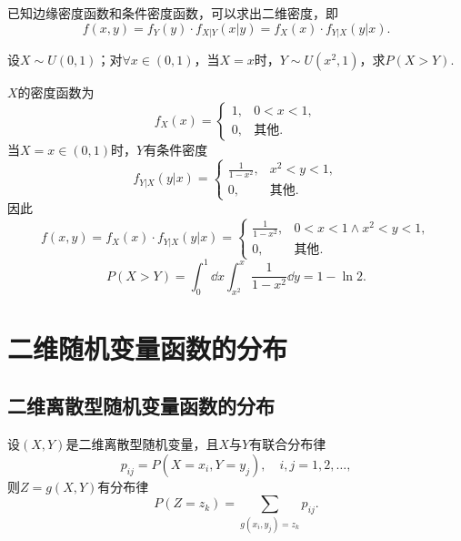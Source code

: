 \begin{corollary}
已知边缘密度函数和条件密度函数，可以求出二维密度，即\[
	f(x,y) = f_Y(y) \cdot f_{X \vert Y}(x \vert y)
	= f_X(x) \cdot f_{Y \vert X}(y \vert x).
\]
\end{corollary}

\begin{example}
设\(X \sim U(0,1)\)；对\(\forall x\in(0,1)\)，当\(X=x\)时，\(Y \sim U(x^2,1)\)，求\(P(X > Y)\).
\begin{solution}
\(X\)的密度函数为\[
f_X(x) = \left\{ \begin{array}{cl}
1, & 0<x<1, \\
0, & \text{其他}.
\end{array} \right.
\]当\(X=x\in(0,1)\)时，\(Y\)有条件密度\[
f_{Y \vert X}(y \vert x)
= \left\{ \begin{array}{cl}
\frac{1}{1-x^2}, & x^2<y<1, \\
0, & \text{其他}.
\end{array} \right.
\]因此\[
f(x,y) = f_X(x) \cdot f_{Y \vert X}(y \vert x)
= \left\{ \begin{array}{cl}
\frac{1}{1-x^2}, & 0<x<1 \land x^2<y<1, \\
0, & \text{其他}.
\end{array} \right.
\]\[
P(X > Y)
= \int_0^1 \dd{x} \int_{x^2}^x \frac{1}{1-x^2} \dd{y}
= 1 - \ln2.
\]
\end{solution}
\end{example}

\section{二维随机变量函数的分布}
\subsection{二维离散型随机变量函数的分布}
设\((X,Y)\)是二维离散型随机变量，且\(X\)与\(Y\)有联合分布律\[
p_{ij} = P(X=x_i,Y=y_j), \quad i,j=1,2,\dotsc,
\]则\(Z = g(X,Y)\)有分布律\[
P(Z=z_k) = \sum_{g(x_i,y_j)=z_k}{p_{ij}}.
\]

